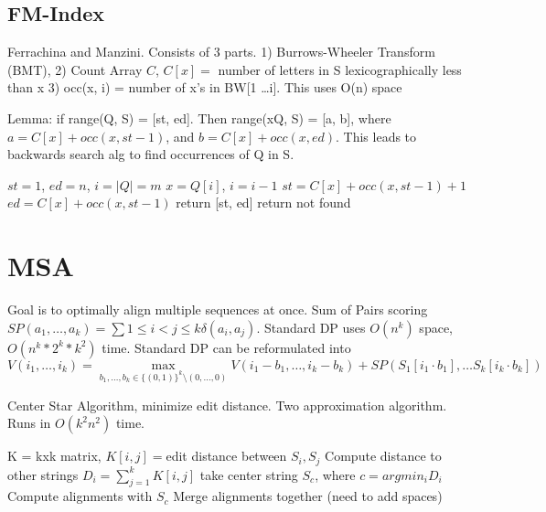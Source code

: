 \documentclass[10pt]{article}
\begin{document}
\subsection{FM-Index}
Ferrachina and Manzini.
Consists of 3 parts. 
1) Burrows-Wheeler Transform (BMT), 
2) Count Array $C$, $C[x] =$ number of letters in S lexicographically less than x
3) occ(x, i) = number of x's in BW[1 \dots i].
This uses O(n) space

Lemma: if range(Q, S) = [st, ed]. Then range(xQ, S) = [a, b], 
where $a = C[x] + occ(x, st-1)$, and $b = C[x] + occ(x, ed)$.
This leads to backwards search alg to find occurrences of Q in S.

\begin{algorithm}[H]
    \begin{algorithmic}[1]
    \tiny
        \State $st=1$, $ed=n$, $i=|Q|=m$
            \State $x = Q[i]$, $i = i-1$
            \State $st = C[x] + occ(x, st-1) + 1$
            \State $ed = C[x] + occ(x, st-1)$
        \EndWhile
            \State return [st, ed]
        \Else
            \State return not found
        \EndIf
    \EndFunction
    \end{algorithmic}
\end{algorithm}

\section{MSA}
Goal is to optimally align multiple sequences at once.
Sum of Pairs scoring $SP(a_1, \dots, a_k) = \sum{1 \leq i < j \leq k} \delta(a_i, a_j)$.
Standard DP uses $O(n^k)$ space, $O(n^k * 2^k *k^2)$ time.
Standard DP can be reformulated into
$$V(i_1, \dots, i_k) = \max_{b_1, \dots, b_k \in \{(0,1)\}^k \setminus (0, \dots, 0)} V(i_1 - b_1, \dots, i_k - b_k) + SP(S_1[i_1 \cdot b_1], \dots S_k[i_k \cdot b_k])$$

Center Star Algorithm, minimize edit distance.
Two approximation algorithm. 
Runs in $O(k^2 n^2)$ time.
\begin{algorithm}[H]
    \begin{algorithmic}[1]
    \tiny
        \State K = kxk matrix, $K[i,j] = $edit distance between $S_i, S_j$
        \State Compute distance to other strings $D_i = \sum_{j=1}^k K[i,j]$
        \State take center string $S_c$, where $c = argmin_{i} D_i$
        \State Compute alignments with $S_c$
        \State Merge alignments together (need to add spaces)
    \EndFunction
    \end{algorithmic}
\end{algorithm}
\end{document}
